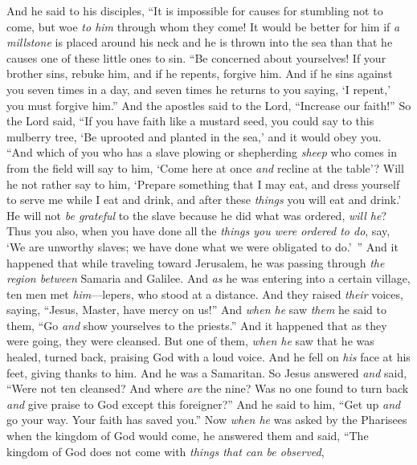 \begin{biblechapter} %
 And he said to his disciples, “It is impossible for causes for stumbling not to come, but woe \textit{to him} through whom they come!
\verse It would be better for him if \textit{a millstone} is placed around his neck and he is thrown into the sea than that he causes one of these little ones to sin.
\verse “Be concerned about yourselves! If your brother sins, rebuke him, and if he repents, forgive him.
\verse And if he sins against you seven times in a day, and seven times he returns to you saying, ‘I repent,’ you must forgive him.”
\verse And the apostles said to the Lord, “Increase our faith!”
\verse So the Lord said, “If you have faith like a mustard seed, you could say to this mulberry tree, ‘Be uprooted and planted in the sea,’ and it would obey you.
\verse “And which of you who has a slave plowing or shepherding \textit{sheep} who comes in from the field will say to him, ‘Come here at once \textit{and} recline at the table’?
\verse Will he not rather say to him, ‘Prepare something that I may eat, and dress yourself to serve me while I eat and drink, and after these \textit{things} you will eat and drink.’
\verse He will not \textit{be grateful} to the slave because he did what was ordered, \textit{will he}?
\verse Thus you also, when you have done all the \textit{things you were ordered to do}, say, ‘We are unworthy slaves; we have done what we were obligated to do.’ ”
 And it happened that while traveling toward Jerusalem, he was passing through \textit{the region between} Samaria and Galilee.
\verse And \textit{as} he was entering into a certain village, ten men met \textit{him}﻿—lepers, who stood at a distance.
\verse And they raised \textit{their} voices, saying, “Jesus, Master, have mercy on us!”
\verse And \textit{when he} saw \textit{them} he said to them, “Go \textit{and} show yourselves to the priests.” And it happened that as they were going, they were cleansed.
\verse But one of them, \textit{when he} saw that he was healed, turned back, praising God with a loud voice.
\verse And he fell on \textit{his} face at his feet, giving thanks to him. And he was a Samaritan.
\verse So Jesus answered \textit{and} said, “Were not ten cleansed? And where \textit{are} the nine?
\verse Was no one found to turn back \textit{and} give praise to God except this foreigner?”
\verse And he said to him, “Get up \textit{and} go your way. Your faith has saved you.”
 Now \textit{when he} was asked by the Pharisees when the kingdom of God would come, he answered them and said, “The kingdom of God does not come with \textit{things that can be observed},

\end{biblechapter}
